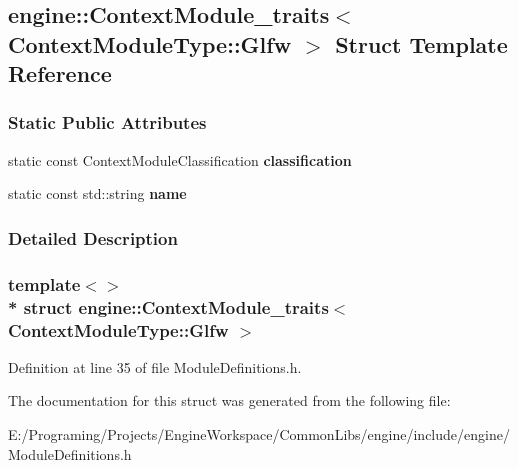 \hypertarget{a00015}{}\subsection{engine\+:\+:Context\+Module\+\_\+traits$<$ Context\+Module\+Type\+:\+:Glfw $>$ Struct Template Reference}
\label{a00015}
\subsubsection*{Static Public Attributes}
\begin{DoxyCompactItemize}
\item 
static const Context\+Module\+Classification {\bfseries classification}\hypertarget{a00015_a39b0ff37cddf6a8c8e7b2ff7524fc4b1}{}\label{a00015_a39b0ff37cddf6a8c8e7b2ff7524fc4b1}

\item 
static const std\+::string {\bfseries name}\hypertarget{a00015_ab441070b94df5afc85da1c6eeff0963a}{}\label{a00015_ab441070b94df5afc85da1c6eeff0963a}

\end{DoxyCompactItemize}


\subsubsection{Detailed Description}
\subsubsection*{template$<$$>$\\*
struct engine\+::\+Context\+Module\+\_\+traits$<$ Context\+Module\+Type\+::\+Glfw $>$}



Definition at line 35 of file Module\+Definitions.\+h.



The documentation for this struct was generated from the following file\+:\begin{DoxyCompactItemize}
\item 
E\+:/\+Programing/\+Projects/\+Engine\+Workspace/\+Common\+Libs/engine/include/engine/Module\+Definitions.\+h\end{DoxyCompactItemize}
